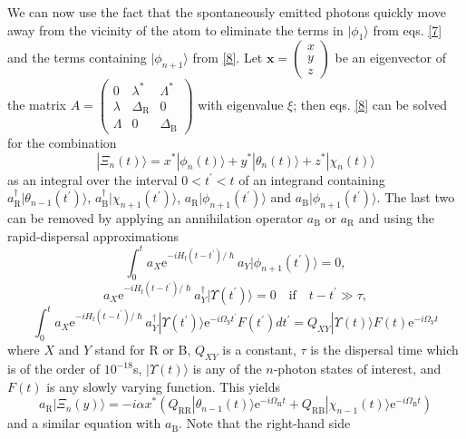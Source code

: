 \documentclass[12pt,a4paper,reqno]{article}
\renewcommand{\(}{\left(}
\renewcommand{\)}{\right)}
\newcommand{\pr}{^\prime}
\newcommand{\e}{\mbox{e}}
\renewcommand{\hbar}{\hslash}
\newcommand{\tR}{\text{R}}
\newcommand{\tB}{\text{B}}
\newcommand{\tf}{\text{f}}
\newcommand{\<}{\langle}
\renewcommand{\>}{\rangle}
\theoremstyle{plain} %
\theoremstyle{definition}
\theoremstyle{remark}
\begin{document}
We can now use the fact that the spontaneously emitted photons quickly
move away from the vicinity of the atom to eliminate the terms in
$|\phi_1\>$ from eqs. \eqref{7} and the terms containing $|\phi_{n+1}\>$
from \eqref{8}. Let $\mathbf{x} = \(\begin{array}{l}x\\y\\z\end{array}\)$
be an eigenvector of the matrix 
$A = \left(\begin{array}{lll}0&\lambda^*&\Lambda^*\\
\lambda&\Delta_{\tR}&0\\\Lambda&0&\Delta_{\tB}\end{array}\right)$ 
with eigenvalue $\xi$; then eqs. \eqref{8} can be solved for the
combination
\begin{equation}
|\Xi_n(t)\> = x^*|\phi_n(t)\> + y^*|\theta_n(t)\> + z^*|\chi_n(t)\>
\end{equation}
as an integral over the interval $0 < t^\prime < t$ of an integrand
containing $a_{\tR}^\dagger|\theta_{n-1}(t^\prime)\>$,
$a_{\tB}^\dagger|\chi_{n+1}(t^\prime)\>$, $a_{\tR}|\phi_{n+1}(t^\prime)\>$ and
$a_{\tB}|\phi_{n+1}(t^\prime)\>$. The last two can be removed by applying
an annihilation operator $a_{\tB}$ or $a_{\tR}$ and using the
rapid-dispersal approximations \cite{rapid-dispersal}
\begin{equation}
\int_0^t a_X\e^{-iH_{\tf}(t-t^\prime)/\hbar}a_Y|\phi_{n+1}(t^\prime)\> = 0,
\end{equation}
\begin{equation}
a_X\e^{-iH_{\tf}(t-t^\prime)/\hbar}a_Y^\dagger|\Upsilon(t\pr)\> = 0
\quad\mbox{if}\quad t-t\pr \gg \tau,
\end{equation}
\begin{equation}
\int_0^t a_X \e^{-iH_{\tf}(t-t\pr)/\hbar}a_Y^\dagger |\Upsilon(t\pr)\>
\e^{-i\Omega_Y t\pr}F(t\pr)dt\pr =
Q_{XY}|\Upsilon(t)\>F(t)\e^{-i\Omega_Y t}
\end{equation}
where $X$ and $Y$ stand for R or B, $Q_{XY}$ is a constant, $\tau$ is
the dispersal time which is of the order of $10^{-18}$s,
$|\Upsilon(t)\>$ is any of the $n$-photon states of interest, and $F(t)$
is any slowly varying function. This yields
\begin{equation}
a_{\tR}|\Xi_n(y)\> = -i\alpha x^*
\(Q_{\tR\tR}|\theta_{n-1}(t)\>\e^{-i\Omega_{\tR}t} +
Q_{\tR\tB}|\chi_{n-1}(t)\>\e^{-i\Omega_{\tB}t}\)
\end{equation}
and a similar equation with $a_{\tB}$. Note that the right-hand side
\end{document}

